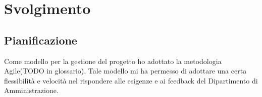 
\chapter{Svolgimento}
\label{cap:svolgimento}


\section{Pianificazione}
	Come modello per la gestione del progetto ho adottato la metodologia Agile(TODO in glossario). Tale
	modello mi ha permesso di adottare una certa flessibilità e velocità nel rispondere alle
	esigenze e ai feedback del Dipartimento di Amministrazione.
	
